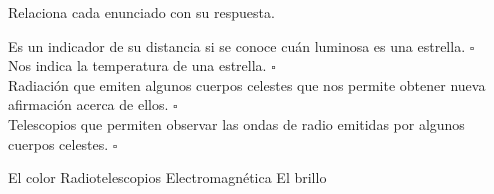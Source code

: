 Relaciona cada enunciado con su respuesta.

\begin{multicols}{2}
    \begin{flushright}
        Es un indicador de su distancia si se conoce cuán luminosa es una estrella. $\square$\\ \vspace{0.5cm}
        Nos indica la temperatura de una estrella. $\square$\\ \vspace{0.5cm}
        Radiación que emiten algunos cuerpos celestes que nos permite obtener nueva afirmación acerca de ellos. $\square$\\ \vspace{0.5cm}
        Telescopios que permiten observar las ondas de radio emitidas por algunos cuerpos celestes. $\square$\\ \vspace{0.5cm}

    \end{flushright}
    \vspace{1cm}
    \begin{checkboxes}
        \choice El color         \vspace{0.8cm}
        \choice Radiotelescopios \vspace{0.8cm}
        \choice Electromagnética \vspace{0.8cm}
        \choice El brillo        \vspace{0.8cm}
    \end{checkboxes}
\end{multicols}